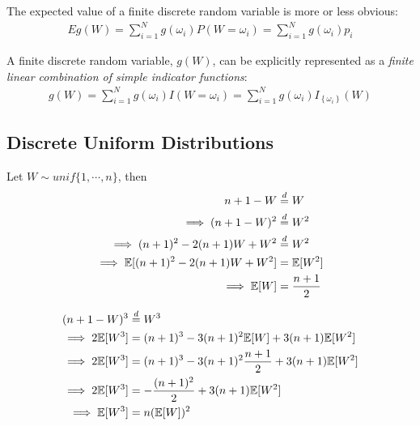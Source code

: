 \documentclass{article}
\begin{document}
	\begin{proposition}
		The expected value of a finite discrete random variable is more or less obvious:
		\begin{align}
			E g(W)=\sum_{i=1}^{N} g\left(\omega_{i}\right) P\left(W=\omega_{i}\right)=\sum_{i=1}^{N} g\left(\omega_{i}\right) p_{i}
		\end{align}
	\end{proposition}
	
	\begin{proposition}
		A finite discrete random variable, $g(W)$, can be explicitly represented as a \emph{finite linear combination of simple indicator functions}:
		\begin{align}
			g(W)=\sum_{i=1}^{N} g\left(\omega_{i}\right) I\left(W=\omega_{i}\right)=\sum_{i=1}^{N} g\left(\omega_{i}\right) I_{\left\{\omega_{i}\right\}}(W)
		\end{align}
	\end{proposition}
	
	\subsection{Discrete Uniform Distributions}
	   	\begin{proposition}
   		Let $W \sim unif\{1, \cdots, n\}$, then
   		\begin{align}
   			n + 1 - W &\overset{d}{=} W \\
   			\implies (n + 1 - W)^2 &\overset{d}{=} W^2 \\
   			\implies (n+1)^2 - 2(n+1)W + W^2 &\overset{d}{=} W^2 \\
   			\implies \mathbb{E}[{(n+1)^2 - 2(n+1)W + W^2}] &= \mathbb{E}[{W^2}] \\
   			\implies \mathbb{E}[{W}] &= \frac{n+1}{2}
   		\end{align}
   	\end{proposition}
   	
   	\begin{proposition}
   		\begin{align}
   			(n+1-W)^3 &\overset{d}{=} W^3 \\
   			\implies 2 \mathbb{E}[{W^3}] &= (n+1)^3 - 3(n+1)^2 \mathbb{E}[{W}] + 3(n+1) \mathbb{E}[{W^2}] \\
   			\implies 2 \mathbb{E}[{W^3}] &= (n+1)^3 - 3(n+1)^2 \frac{n+1}{2} + 3(n+1) \mathbb{E}[{W^2}] \\
   			\implies 2 \mathbb{E}[{W^3}] &= - \frac{(n+1)^2}{2} + 3(n+1) \mathbb{E}[{W^2}] \\
   			\implies \mathbb{E}[{W^3}] &= n (\mathbb{E}[{W}])^2
   		\end{align}
   	\end{proposition}
   	
\end{document}
